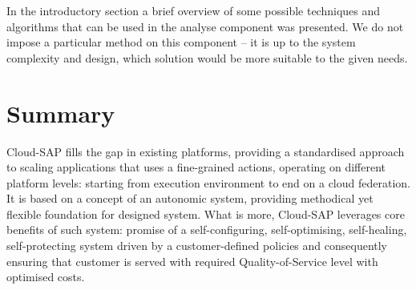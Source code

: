 In the introductory section a brief overview of some possible techniques and algorithms that can be used in the analyse component was presented. We do not impose a particular method on this component -- it is up to the system complexity and design, which solution would be more suitable to the given needs.

\section{Summary}
Cloud-SAP fills the gap in existing platforms, providing a standardised approach to scaling applications that uses a fine-grained actions, operating on different platform levels: starting from execution environment to end on a cloud federation. It is based on a concept of an autonomic system, providing methodical yet flexible foundation for designed system. What is more, Cloud-SAP leverages core benefits of such system: promise of a self-configuring, self-optimising, self-healing, self-protecting system driven by a customer-defined policies and consequently ensuring that customer is served with required Quality-of-Service level with optimised costs.


